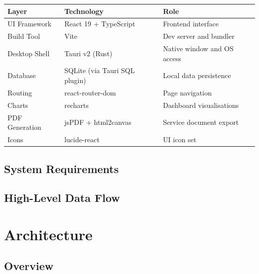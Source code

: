 \documentclass[12pt, a4paper]{report}
\begin{document}
	\begin{tabularx}{\textwidth}{l l X}
		\toprule
		\textbf{Layer}    & \textbf{Technology}         & \textbf{Role} \\
		\midrule
		UI Framework      & React 19 + TypeScript        & Frontend interface \\
		Build Tool        & Vite                         & Dev server and bundler \\
		Desktop Shell     & Tauri v2 (Rust)              & Native window and OS access \\
		Database          & SQLite (via Tauri SQL plugin) & Local data persistence \\
		Routing           & react-router-dom             & Page navigation \\
		Charts            & recharts                     & Dashboard visualisations \\
		PDF Generation    & jsPDF + html2canvas          & Service document export \\
		Icons             & lucide-react                 & UI icon set \\
		\bottomrule
	\end{tabularx}
	
	\section{System Requirements}
	
	\section{High-Level Data Flow}
	
	\chapter{Architecture}
	
	\section{Overview}
	
\end{document}
